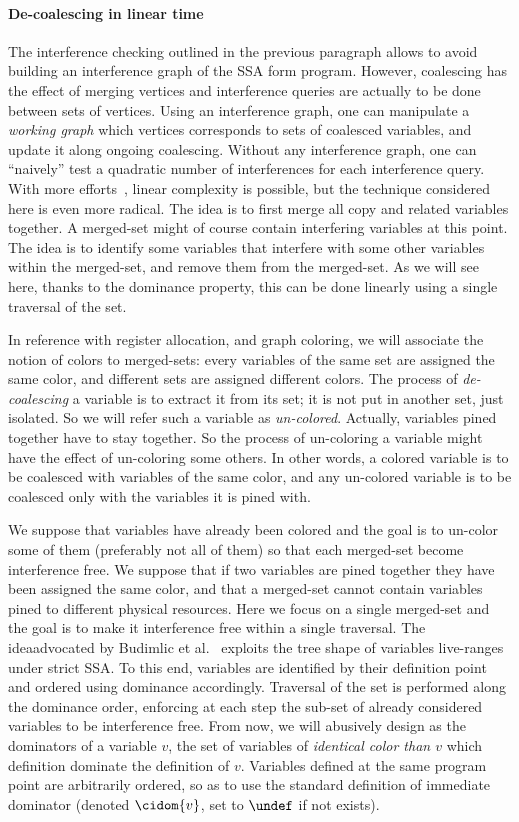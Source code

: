 \paragraph{De-coalescing in linear time}
The interference checking outlined in the previous paragraph allows to avoid building an interference graph of the SSA form program. However, coalescing has the effect of merging vertices and interference queries are actually to be done between sets of vertices. Using an interference graph, one can manipulate a \emph{working graph} which vertices corresponds to sets of coalesced variables, and update it along ongoing coalescing. Without any interference graph, one can ``naively'' test a quadratic number of interferences for each interference query. With more efforts\ifhab~\cite{Boissinot09}\fi, linear complexity is possible, but the technique considered here is even more radical. The idea is to first merge all copy and \phifun related variables together. A merged-set might of course contain interfering variables at this point. The idea is to identify some variables that interfere with some other variables within the merged-set, and remove them from the merged-set. As we will see here, thanks to the dominance property, this can be done linearly using a single traversal of the set.

In reference with register allocation, and graph coloring, we will associate the notion of colors to merged-sets: every variables of the same set are assigned the same color, and different sets are assigned different colors. The process of \emph{de-coalescing} a variable is to extract it from its set; it is not put in another set, just isolated. So we will refer such a variable as \emph{un-colored}. Actually, variables pined together have to stay together. So the process of un-coloring a variable might have the effect of un-coloring some others. In other words, a colored variable is to be coalesced with variables of the same color, and any un-colored variable is to be coalesced only with the variables it is pined with. 


We suppose that variables have already been colored and the goal is to un-color some of them (preferably not all of them) so that each merged-set become interference free. We suppose that if two variables are pined together they have been assigned the same color, and that a merged-set cannot contain variables pined to different physical resources. Here we focus on a single merged-set and the goal is to make it interference free within a single traversal. The idea\ifhab advocated by Budimlic et al.~\cite{Budimlic02} \fi exploits the tree shape of variables live-ranges under strict SSA. To this end, variables are identified by their definition point and ordered using dominance accordingly. Traversal of the set is performed along the dominance order, enforcing at each step the sub-set of already considered variables to be interference free. From now, we will abusively design as the dominators of a variable $v$, the set of variables of \emph{identical color than $v$} which definition dominate the definition of $v$. Variables defined at the same program point are arbitrarily ordered, so as to use the standard definition of immediate dominator (denoted $\cidom{v}$, set to $\undef$ if not exists).

